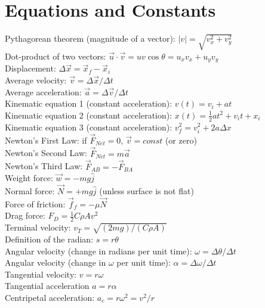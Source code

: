 \documentclass[10pt]{article}
\begin{document}
\maketitle
\small
\section{Equations and Constants}
Pythagorean theorem (magnitude of a vector): $|v| = \sqrt{v_x^2+v_y^2}$ \\
Dot-product of two vectors: $\vec{u} \cdot \vec{v} = uv\cos\theta = u_x v_x + u_y v_y$ \\
Displacement: $\Delta \vec{x} = \vec{x}_f - \vec{x}_i$ \\
Average velocity: $\vec{v} = \Delta \vec{x}/\Delta t$ \\
Average acceleration: $\vec{a} = \Delta \vec{v}/\Delta t$ \\
Kinematic equation 1 (constant acceleration): $v(t) = v_i + at$ \\
Kinematic equation 2 (constant acceleration): $x(t) = \frac{1}{2}at^2+v_i t+x_i$ \\
Kinematic equation 3 (constant acceleration): $v_f^2 = v_i^2 + 2 a \Delta x$ \\
Newton's First Law: if $\vec{F}_{Net} = 0$, $\vec{v} = const$ (or zero) \\
Newton's Second Law: $\vec{F}_{Net} = m \vec{a}$ \\
Newton's Third Law: $\vec{F}_{AB} = - \vec{F}_{BA}$ \\
Weight force: $\vec{w} = -mg\hat{j}$ \\
Normal force: $\vec{N} = +mg\hat{j}$ (unless surface is not flat) \\
Force of friction: $\vec{f}_f = -\mu \vec{N}$ \\
Drag force: $F_D = \frac{1}{2}C\rho A v^2$ \\
Terminal velocity: $v_T = \sqrt{(2mg)/(C\rho A)}$ \\
Definition of the radian: $s = r \theta$ \\
Angular velocity (change in radians per unit time): $\omega = \Delta \theta/\Delta t$ \\
Angular velocity (change in $\omega$ per unit time): $\alpha = \Delta \omega/\Delta t$ \\
Tangential velocity: $v = r\omega$ \\
Tangential acceleration $a = r\alpha$ \\
Centripetal acceleration: $a_c = r\omega^2 = v^2/r$ \\
\end{document}
